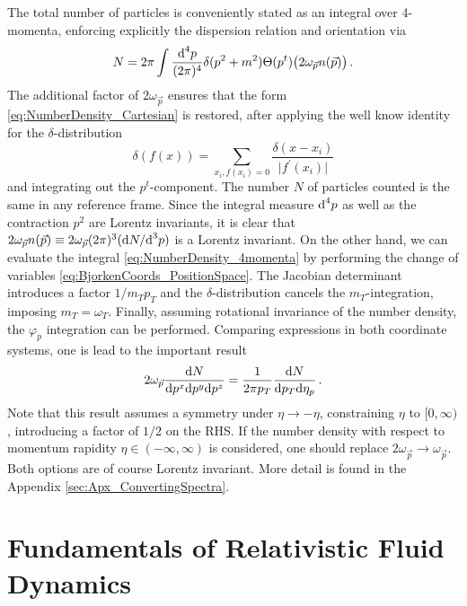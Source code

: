 The total number of particles is conveniently stated as an integral over 4-momenta, enforcing explicitly the dispersion relation and orientation via 
\begin{equation}
    N=2\pi\int\frac{\text{d}^4p}{(2\pi)^4}\delta(p^2+m^2)\Theta(p^t)\big(2\omega_{\vec{p}}n(\vec{p})\big)\,.
    \label{eq:NumberDensity_4momenta}
\end{equation}
The additional factor of $2\omega_{\vec{p}}$ ensures that the form \eqref{eq:NumberDensity_Cartesian} is restored, after applying the well know identity for the $\delta$-distribution
\begin{equation}
    \delta(f(x))=\sum_{x_i, f(x_i)=0}\frac{\delta(x-x_i)}{\vert f^\prime(x_i)\vert}
\end{equation}
and integrating out the $p^t$-component. The number $N$ of particles counted is the same in any reference frame. Since the integral measure $\text{d}^4p$ as well as the contraction $p^2$ are Lorentz invariants, it is clear that ${2\omega_{\vec{p}}n(\vec{p})\equiv 2\omega_{\vec{p}}(2\pi)^3(\text{d} N/\text{d}^3p)}$ is a Lorentz invariant. On the other hand, we can evaluate the integral \eqref{eq:NumberDensity_4momenta} by performing the change of variables \eqref{eq:BjorkenCoords_PositionSpace}. The Jacobian determinant introduces a factor ${1/m_Tp_T}$ and the $\delta$-distribution cancels the $m_T$-integration, imposing $m_T=\omega_T$. Finally, assuming rotational invariance of the number density, the $\varphi_p$ integration can be performed. Comparing expressions in both coordinate systems, one is lead to the important result
\begin{equation}
    2\omega_{\vec{p}}\frac{\text{d} N}{\text{d} p^x\text{d} p^y\text{d} p^z}=\frac{1}{2\pi p_T}\frac{\text{d} N}{\text{d} p_T\text{d} \eta_p}\,.
    \label{eq:SpectraConversion}
\end{equation}
Note that this result assumes a symmetry under ${\eta\to-\eta}$, constraining $\eta$ to ${[0,\infty)}$, introducing a factor of $1/2$ on the RHS. If the number density with respect to momentum rapidity ${\eta\in(-\infty,\infty)}$ is considered, one should replace ${2\omega_{\vec{p}}\to\omega_{\vec{p}}}$. Both options are of course Lorentz invariant. More detail is found in the Appendix \ref{sec:Apx_ConvertingSpectra}.



\section{Fundamentals of Relativistic Fluid Dynamics}


